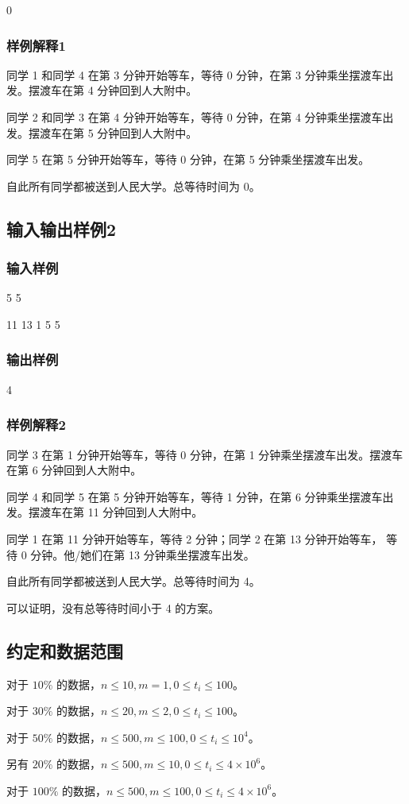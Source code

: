 \documentclass[UTF8]{ctexart}
\begin{document}
0

\subsubsection{样例解释1}

同学 1 和同学 4 在第 3 分钟开始等车，等待 0 分钟，在第 3 分钟乘坐摆渡车出发。摆渡车在第 4 分钟回到人大附中。

同学 2 和同学 3 在第 4 分钟开始等车，等待 0 分钟，在第 4 分钟乘坐摆渡车出发。摆渡车在第 5 分钟回到人大附中。

同学 5 在第 5 分钟开始等车，等待 0 分钟，在第 5 分钟乘坐摆渡车出发。

自此所有同学都被送到人民大学。总等待时间为 0。

\subsection{输入输出样例2}
\subsubsection{输入样例}

5 5 

11 13 1 5 5 

\subsubsection{输出样例}

4

\subsubsection{样例解释2}

同学 3 在第 1 分钟开始等车，等待 0 分钟，在第 1 分钟乘坐摆渡车出发。摆渡车在第 6 分钟回到人大附中。

同学 4 和同学 5 在第 5 分钟开始等车，等待 1 分钟，在第 6 分钟乘坐摆渡车出发。摆渡车在第 11 分钟回到人大附中。

同学 1 在第 11 分钟开始等车，等待 2 分钟；同学 2 在第 13 分钟开始等车， 等待 0 分钟。他/她们在第 13 分钟乘坐摆渡车出发。

自此所有同学都被送到人民大学。总等待时间为 4。

可以证明，没有总等待时间小于 4 的方案。

\subsection{约定和数据范围}

对于 $10\%$ 的数据，$n\le 10,m=1,0\le t_i\le 100$。

对于 $30\%$ 的数据，$n\le 20,m\le 2,0\le t_i\le 100$。

对于 $50\%$ 的数据，$n\le 500,m\le 100,0\le t_i\le 10^4$。

另有 $20\%$ 的数据，$n\le 500,m\le 10,0\le t_i\le 4\times 10^6$。

对于 $100\%$ 的数据，$n\le 500,m\le 100,0\le t_i\le 4\times 10^6$。 
\end{document}
